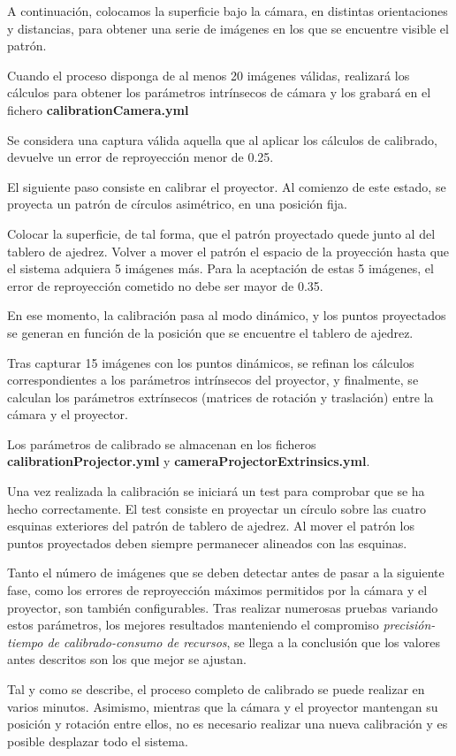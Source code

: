 A continuación, colocamos la superficie bajo la cámara, en distintas orientaciones y distancias, para obtener una serie de imágenes en los que se encuentre visible el patrón.

Cuando el proceso disponga de al menos 20 imágenes válidas, realizará los cálculos para obtener los parámetros intrínsecos de cámara y los grabará en el fichero \textbf{calibrationCamera.yml}

Se considera una captura válida aquella que al aplicar los cálculos de calibrado, devuelve un error de reproyección menor de 0.25. 

El siguiente paso consiste en calibrar el proyector. Al comienzo de este estado, se proyecta un patrón de círculos asimétrico, en una posición fija.

Colocar la superficie, de tal forma, que el patrón proyectado quede junto al del tablero de ajedrez. Volver a mover el patrón el espacio de la  proyección hasta que el sistema adquiera 5 imágenes más. Para la aceptación de estas 5 imágenes, el error de reproyección cometido no debe ser mayor de 0.35.

En ese momento, la calibración pasa al modo dinámico, y los puntos proyectados se generan en función de la posición que se encuentre el tablero de ajedrez.

Tras capturar 15 imágenes con los puntos dinámicos, se refinan los cálculos correspondientes a los parámetros intrínsecos del proyector, y finalmente, se calculan los parámetros extrínsecos (matrices de rotación y traslación) entre la cámara y el proyector.

Los parámetros de calibrado se almacenan en los ficheros \textbf{calibrationProjector.yml} y \textbf{cameraProjectorExtrinsics.yml}.

Una vez realizada la calibración se iniciará un test para comprobar que se ha hecho correctamente. El test consiste en proyectar un círculo sobre las cuatro esquinas exteriores del patrón de tablero de ajedrez. Al mover el patrón los puntos proyectados deben siempre permanecer alineados con las esquinas.

Tanto el número de imágenes que se deben detectar antes de pasar a la siguiente fase, como los errores de reproyección máximos permitidos por la cámara y el proyector, son también configurables. Tras realizar numerosas pruebas variando estos parámetros, los mejores resultados manteniendo el compromiso \textit{precisión-tiempo de calibrado-consumo de recursos}, se llega a la conclusión que los valores antes descritos son los que mejor se ajustan. 

Tal y como se describe, el proceso completo de calibrado se puede realizar en varios minutos. Asimismo, mientras que la cámara y el proyector mantengan su posición y rotación entre ellos, no es necesario realizar una nueva calibración y es posible desplazar todo el sistema.
